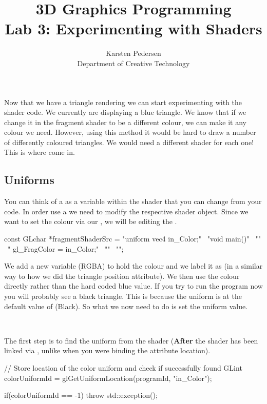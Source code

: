 \documentclass[10pt]{article}
\begin{document}
\title{3D Graphics Programming \\
  \large Lab 3: Experimenting with Shaders}

\author{Karsten Pedersen\\ Department of Creative Technology}
\maketitle

Now that we have a triangle rendering we can start experimenting with
the shader code. We currently are displaying a blue triangle. We know
that if we change it in the fragment shader to be a different colour,
we can make it any colour we need. However, using this method it would
be hard to draw a number of differently coloured triangles. We would
need a different shader for each one! This is where  come in.

\subsection*{Uniforms}

You can think of a  as a variable within the shader that you
can change from your  code.  In order use a 
we need to modify the respective shader object. Since we want to set
the colour via our , we will be editing the .

\begin{Code}
const GLchar *fragmentShaderSrc =
  "uniform vec4 in_Color;" \
  "void main()" \
  "{" \
  "  gl_FragColor = in_Color;" \
  "}" \
  "";
\end{Code}

We add a new  variable (RGBA) to hold the colour and
we label it as  (in a similar way to how we did the
triangle position attribute).  We then use the colour directly rather
than the hard coded blue value.  If you try to run the program now you
will probably see a black triangle. This is because the uniform is at
the default value of \Command{(0, 0, 0, 0)} (Black). So what we now need to do
is set the uniform value.

\

The first step is to find the uniform from the shader (\textbf{After}
the shader has been linked via , unlike when you
were binding the attribute location).

\begin{Code}
// Store location of the color uniform and check if successfully found
GLint colorUniformId = glGetUniformLocation(programId, "in_Color");

if(colorUniformId == -1)
{
  throw std::exception();
}
\end{Code}
\end{document}

